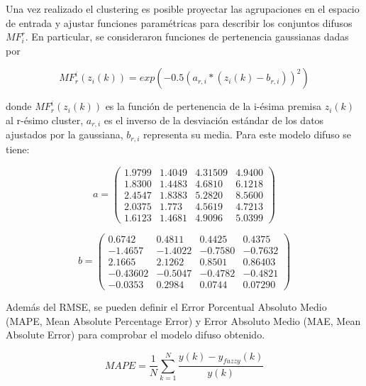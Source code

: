 \documentclass[12pt]{article}
\begin{document}
\begin{itemize}
\newpage

Una vez realizado el clustering es posible proyectar las agrupaciones en el espacio de
entrada y ajustar funciones paramétricas para describir los conjuntos difusos $MF_i^r$. En
particular, se consideraron funciones de pertenencia gaussianas dadas por

\begin{equation}
MF_r^i(z_i(k))=exp(-0.5(a_{r,i}*(z_i(k)-b_{r,i}))^2)
\label{e_Gaussiana}
\end{equation}

donde $MF_r^i(z_i(k))$ es la función de pertenencia de la i-ésima premisa $z_i(k)$ al r-ésimo
cluster, $a_{r,i}$ es el inverso de la desviación estándar de los datos ajustados por la
gaussiana, $b_{r,i}$ representa su media. Para este modelo difuso se tiene:


\begin{equation}
a=
\left(
  \begin{array}{cccc}
 1.9799	&1.4049	& 4.31509&	4.9400\\
1.8300&	1.4483	& 4.6810&	6.1218\\
2.4547	&1.8383	& 5.2820&	8.5600\\
2.0375	&1.773	& 4.5619&	4.7213\\
1.6123&	1.4681&	4.9096	&5.0399
  \end{array}
\right)
\label{e_ParA}
\end{equation}

\begin{equation}
b=
\left(
  \begin{array}{cccc}
0.6742&	0.4811&	0.4425&	0.4375\\
-1.4657&	-1.4022&	-0.7580&	-0.7632\\
2.1665&	2.1262&	0.8501&	0.86403\\
-0.43602&	-0.5047&	-0.4782&	-0.4821\\
-0.0353&	0.2984&	0.0744&	0.07290
  \end{array}
\right)
\label{e_ParB}
\end{equation}

Además del RMSE, se pueden definir el Error Porcentual Absoluto Medio (MAPE, Mean Absolute Percentage Error) y Error Absoluto Medio (MAE, Mean Absolute Error) para comprobar el modelo difuso obtenido.

\begin{equation}
MAPE=\frac{1}{N}\sum_{k=1}^{N}\frac{y(k)-y_{fuzzy}(k)}{y(k)}
\label{e_MAPE}
\end{equation}


\end{itemize}
\end{document}
